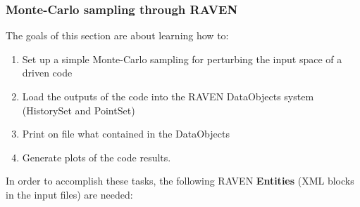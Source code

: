 \subsubsection{Monte-Carlo sampling through RAVEN}
\label{subsub:MCexample}
The goals of this section are about learning how to:
 \begin{enumerate}
   \item Set up a simple Monte-Carlo sampling for perturbing the input 
   space of a driven code
   \item Load the outputs of the code into the RAVEN DataObjects 
   system (HistorySet and PointSet)
   \item Print on file what contained in the DataObjects
   \item Generate plots of the code results.
\end{enumerate}  
In order to accomplish these tasks, the following RAVEN \textbf{Entities} (XML blocks in the input files) are needed:
